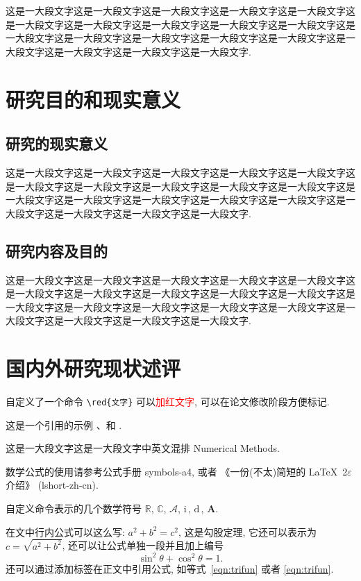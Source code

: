 \documentclass{phdproposal}
\newcommand{\CC}{\ensuremath{\mathbb{C}}}
\newcommand{\RR}{\ensuremath{\mathbb{R}}}
\newcommand{\A}{\mathcal{A}}
\newcommand{\ii}{\bm{\mathrm{i}}\,}  %
\newcommand{\md}{\mathrm{d}\,}
\newcommand{\bA}{\boldsymbol{A}}
\newcommand{\red}[1]{\textcolor{red}{#1}}
\begin{document}
这是一大段文字这是一大段文字这是一大段文字这是一大段文字这是一大段文字这是一大段文字这是一大段文字这是一大段文字这是一大段文字这是一大段文字这是一大段文字这是一大段文字这是一大段文字这是一大段文字这是一大段文字这是一大段文字这是一大段文字这是一大段文字这是一大段文字.


\section{研究目的和现实意义}
\subsection{研究的现实意义}

这是一大段文字这是一大段文字这是一大段文字这是一大段文字这是一大段文字这是一大段文字这是一大段文字这是一大段文字这是一大段文字这是一大段文字这是一大段文字这是一大段文字这是一大段文字这是一大段文字这是一大段文字这是一大段文字这是一大段文字这是一大段文字这是一大段文字.



\subsection{研究内容及目的}

这是一大段文字这是一大段文字这是一大段文字这是一大段文字这是一大段文字这是一大段文字这是一大段文字这是一大段文字这是一大段文字这是一大段文字这是一大段文字这是一大段文字这是一大段文字这是一大段文字这是一大段文字这是一大段文字这是一大段文字这是一大段文字这是一大段文字.



\section{国内外研究现状述评} %


自定义了一个命令 \verb|\red{文字}| 可以\red{加红文字}, 可以在论文修改阶段方便标记.

这是一个引用的示例 \cite{Adams1975}、\cite{LiLiu1997}和 \cite{Shen1994,Tadmor2012,TreWei2014}.

这是一大段文字这是一大段文字中英文混排 Numerical Methods.

数学公式的使用请参考公式手册 symbols-a4, 或者 《一份(不太)简短的 \LaTeX~2$\varepsilon$ 介绍》 (lshort-zh-cn).

自定义命令表示的几个数学符号 $\RR$, $\CC$, $\A$, $\ii$, $\md$, $\bA$.

在文中行内公式可以这么写: $a^2+b^2=c^2$, 这是勾股定理, 它还可以表示为 $c=\sqrt{a^2+b^2}$, 还可以让公式单独一段并且加上编号
\begin{equation}\label{eqn:trifun}
\sin^2{\theta}+\cos^2{\theta}=1.
\end{equation}
还可以通过添加标签在正文中引用公式, 如等式~\eqref{eqn:trifun} 或者 \ref{eqn:trifun}.
\end{document}
